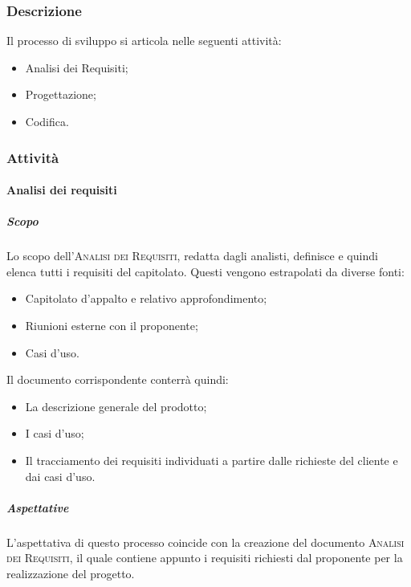 \documentclass[../norme-di-progetto.tex]{subfiles}
\begin{document}
\subsubsection{Descrizione}
Il processo di sviluppo si articola nelle seguenti attività:
\begin{itemize}
  \item Analisi dei Requisiti;
  \item Progettazione;
  \item Codifica.
\end{itemize}

\subsubsection{Attività}
\paragraph{Analisi dei requisiti}
\subparagraph{Scopo}
Lo scopo dell'\textsc{Analisi dei Requisiti}, redatta dagli analisti, definisce e quindi elenca tutti i requisiti del capitolato. Questi vengono estrapolati da diverse fonti:
\begin{itemize}
  \item Capitolato d'appalto e relativo approfondimento;
  \item Riunioni esterne con il proponente;
  \item Casi d'uso.
\end{itemize}
Il documento corrispondente conterrà quindi:
\begin{itemize}
  \item La descrizione generale del prodotto;
  \item I casi d'uso;
  \item Il tracciamento dei requisiti individuati a partire dalle richieste del cliente e dai casi d'uso.
\end{itemize}

\subparagraph{Aspettative}
L'aspettativa di questo processo coincide con la creazione del documento \textsc{Analisi dei Requisiti}, il quale contiene appunto i requisiti richiesti dal proponente per la realizzazione del progetto.
\end{document}
